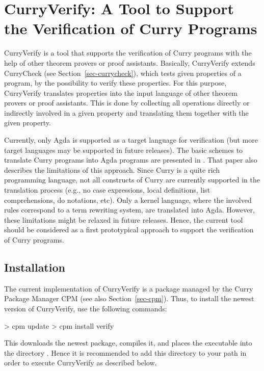 \section{CurryVerify: A Tool to Support the Verification of Curry Programs}
\label{sec-curry2verify}

CurryVerify
is a tool that supports the verification of Curry programs
with the help of other theorem provers or proof assistants.
Basically, CurryVerify extends CurryCheck (see Section~\ref{sec-currycheck}),
which tests given properties of a program,
by the possibility to verify these properties.
For this purpose, CurryVerify translates properties
into the input language of other theorem provers or proof assistants.
This is done by collecting all operations directly or indirectly
involved in a given property and translating them together with
the given property.

Currently, only Agda \cite{Norell09} is supported as
a target language for verification (but more target languages
may be supported in future releases).
The basic schemes to translate Curry programs into Agda programs
are presented in \cite{AntoyHanusLibby17EPTCS}.
That paper also describes the limitations of this approach.
Since Curry is a quite rich programming language,
not all constructs of Curry are currently supported
in the translation process (e.g., no case expressions,
local definitions, list comprehensions, do notations, etc).
Only a kernel language, where the involved rules
correspond to a term rewriting system, are translated into Agda.
However, these limitations might be relaxed in future releases.
Hence, the current tool should be considered as a first prototypical
approach to support the verification of Curry programs.

\subsection{Installation}

The current implementation of CurryVerify is a package
managed by the Curry Package Manager CPM
(see also Section~\ref{sec-cpm}).
Thus, to install the newest version of CurryVerify, use the following commands:
%
\begin{curry}
> cpm update
> cpm install verify
\end{curry}
%
This downloads the newest package, compiles it, and places
the executable  into the directory .
Hence it is recommended to add this directory to your path
in order to execute CurryVerify as described below.

